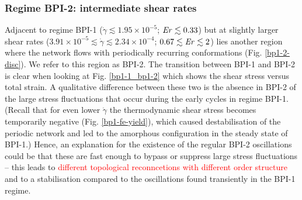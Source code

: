 \documentclass[8.5pt,twoside,twocolumn]{article}
\newcommand{\e}[1]{\times10^{#1}}
\newcommand{\gd}{\dot{\gamma}}
\newcommand{\rev}[1]{{\textcolor{red}{#1}}}
\begin{document}
\subsubsection{Regime BPI-2: intermediate shear rates }

Adjacent to regime BPI-1 ($\gd\lesssim1.95\e{-5}$; $ {\it Er}\lesssim 0.33$) but 
at slightly larger shear rates ($3.91\e{-5}\lesssim\gd\lesssim 2.34\e{-4}$; $0.67\lesssim{\it Er}\lesssim2$)
lies another region where the network flows with periodically 
recurring conformations (Fig. \ref{bp1-2-disc}). 
We refer to this region as BPI-2. The transition between BPI-1 and BPI-2 
is clear when looking at Fig. \ref{bp1-1_bp1-2} 
which shows the shear stress versus total strain. 
A qualitative difference between these two is the absence in BPI-2 of the 
large stress fluctuations that occur during the early cycles in regime BPI-1.
(Recall that for even lower $\gd$ the thermodynamic shear stress becomes 
temporarily negative (Fig. \ref{bp1-fe-yield}), which 
caused destabilisation of the periodic network and led to the 
amorphous configuration in the steady state of BPI-1.)
Hence, an explanation
for the existence of the regular BPI-2 oscillations 
could be that these are fast enough to bypass or suppress 
large stress fluctuations -- this leads to
\rev{
different topological reconncetions with different order structure
}
and to a stabilisation 
compared to the oscillations found transiently in
the BPI-1 regime.
\end{document}
